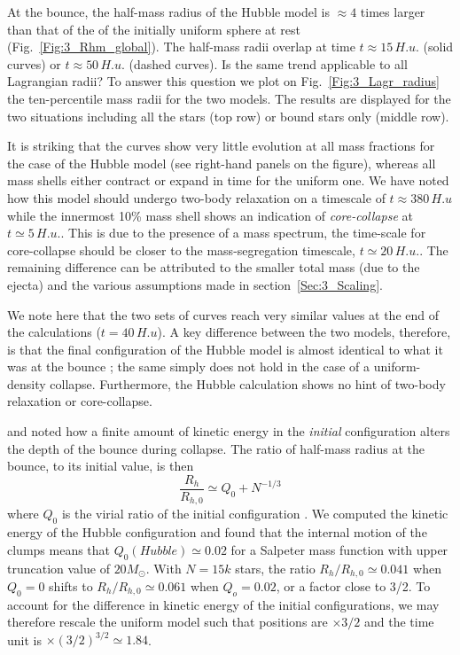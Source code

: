 At the bounce, the half-mass radius of the Hubble model is $\approx 4$ times larger than that of the of the initially uniform sphere at rest (Fig.~\ref{Fig:3_Rhm_global}). The half-mass radii overlap at time $t \approx 15 \,H.u.$ (solid curves) or $t \approx 50 \,H.u.$ (dashed curves). Is the same trend applicable to all Lagrangian radii? To answer this question we plot on Fig.~\ref{Fig:3_Lagr_radius} the ten-percentile mass radii for the two models. The results are displayed for the two situations including all the stars (top row) or bound stars only (middle row). 

It is striking that the curves show very little evolution at all mass fractions for the case of the Hubble model (see right-hand panels on the figure), whereas all mass shells either contract or expand in time for the uniform one. We have noted how this model should undergo two-body relaxation on a timescale of $t \approx 380 \,H.u$ while the innermost 10\% mass shell shows an  indication of \textit{core-collapse} at $t \simeq 5 \,H.u.$. This is due to the presence of a mass spectrum, the time-scale for core-collapse should be closer to the mass-segregation timescale,  $t \simeq 20 \,H.u.$. The remaining difference can be attributed to the smaller total mass (due to the ejecta) and the various assumptions made in section~\ref{Sec:3_Scaling}.

We note here that the two sets of curves reach very similar values at the end of the calculations ($t = 40\, H.u$). A key difference between the two models, therefore, is that the final configuration of the Hubble model is almost identical to what it was at the bounce ; the same simply does not hold in the case of a uniform-density collapse. Furthermore, the Hubble calculation shows no hint of two-body relaxation or core-collapse.

\cite{Caputo2014} and \cite{Theis1999} noted how a finite amount of kinetic energy in the {\it initial} configuration alters the  depth of the bounce during collapse. The ratio of half-mass radius at the bounce, to its initial value, is then
\begin{equation}
\frac{R_h}{R_{h,0}} \simeq Q_0 + N^{-1/3}
\end{equation} 
 where $Q_0$ is the virial ratio of the initial configuration \citep[see][Fig.5]{Caputo2014}. We computed the kinetic energy of the  Hubble configuration and found that the internal motion of the clumps means that $Q_0 (Hubble) \simeq 0.02$ for a Salpeter mass function with upper truncation value of $20 M_\odot$. With $N = 15k$ stars, the ratio $R_h/R_{h,0} \simeq 0.041$ when $Q_0 = 0$ shifts to $R_h/R_{h,0} \simeq 0.061$ when $Q_o = 0.02$, or a factor close to 3/2. To account for the difference in kinetic energy of the initial configurations, we may therefore rescale the uniform model such that positions are  $ \times 3/2$ and the time unit is $\times (3/2)^{3/2} \simeq 1.84$.
 

